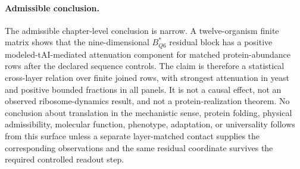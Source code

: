 \paragraph{Admissible conclusion.}
The admissible chapter-level conclusion is narrow.  A twelve-organism finite matrix shows that the nine-dimensional $B^*_{Q6}$ residual block has a positive modeled-tAI-mediated attenuation component for matched protein-abundance rows after the declared sequence controls.  The claim is therefore a statistical cross-layer relation over finite joined rows, with strongest attenuation in yeast and positive bounded fractions in all panels.  It is not a causal effect, not an observed ribosome-dynamics result, and not a protein-realization theorem.  No conclusion about translation in the mechanistic sense, protein folding, physical admissibility, molecular function, phenotype, adaptation, or universality follows from this surface unless a separate layer-matched contact supplies the corresponding observations and the same residual coordinate survives the required controlled readout step.
